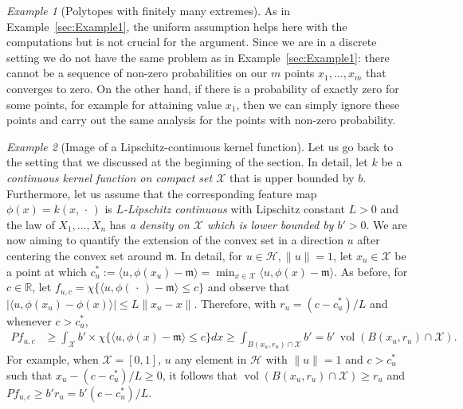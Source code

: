 \documentclass[AHL,Unicode,longabstracts,published]{cedram}
\theoremstyle{remark}
\newtheorem{examl}{Example}
\DeclareMathOperator{\vol}{vol}
\newcommand{\R}{\mathbb{R}}
\newcommand{\X}{\mathcal{X}}
\newcommand{\cH}{\mathcal{H}}
\newcommand{\mean}{\mathfrak{m}}
\begin{document}
\begin{examl}[{Polytopes with finitely many extremes}]
As in Example~\ref{sec:Example1}, the uniform assumption helps here with the computations but is not crucial for the argument. Since we are in a discrete setting we do not have the same problem as in Example~\ref{sec:Example1}: there cannot be a sequence of non-zero probabilities on our $m$ points $x_1,\dots,x_m$ that converges to zero. On the other hand, if there is a probability of exactly zero for some points, for example for attaining value $x_1$, then we can simply ignore these points and carry out the same analysis for the points with non-zero probability.
\end{examl}


\begin{examl}[{Image of a Lipschitz-continuous kernel function}] \label{sec:Lower_bnd_P_Lipschitz}
Let us go back to the setting that we discussed at the beginning of the section. In detail, let $k$ be a \emph{continuous kernel function on compact set $\X$} that is upper bounded by $b$. Furthermore, let us assume that the corresponding feature map $\phi(x) = k(x,\,\cdot\,)$ is \emph{$L$-Lipschitz continuous} with Lipschitz constant $L>0$ and the law of $X_1,\dots,X_n$ has \emph{a density on $\X$ which is lower bounded by $b'> 0$}. We are now aiming to quantify the extension of the convex set in a direction $u$ after centering the convex set around $\mean$. In detail, for $u\in \cH, \|u\|=1$, let $x_u \in \X$ be a point at which $c_u^* := \langle u,\phi(x_u) - \mean \rangle = \min_{x\in \X} \langle u,\phi(x) -\mean \rangle$. As before, for $c\in \R$, let $f_{u,c} = \chi \{\langle u, \phi(\,\cdot\,) - \mean \rangle \leq c \}$ and observe that $|\langle u, \phi(x_u) - \phi(x)\rangle| \leq L \|x_u - x\|$. Therefore, with $r_u = (c - c_u^*)/L$ and whenever $c > c_u^*$,
\begin{align*}
P f_{u,c} &\geq \int_\X b' \times \chi\{\langle u, \phi(x) - \mean \rangle \leq c \} dx \geq \int_{B(x_u,r_u)\cap \X} b' = b'\, \vol(B(x_u,r_u)\cap \X).
\end{align*}
For example, when $\X = [0,1]$, $u$ any element in $\cH$ with $\|u\|=1$ and $c > c_u^*$ such that $x_u - (c-c_u^*)/L \geq 0$, it follows that $\vol(B(x_u,r_u) \cap \X) \geq r_u$ and $P f_{u,c} \geq b'r_u = b' (c- c_u^*)/L$.


\end{examl}
\end{document}

